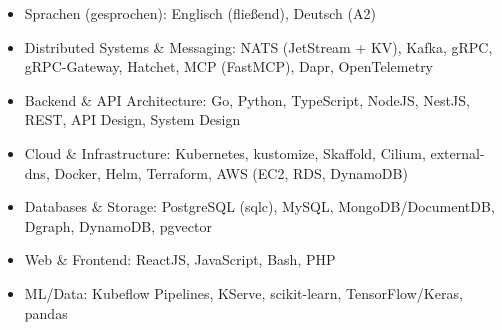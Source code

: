 \documentclass[10pt,a4paper]{resume}
\begin{document}
\begin{itemize}[leftmargin=1.4em,nosep,topsep=2pt]
  \item Sprachen (gesprochen): Englisch (fließend), Deutsch (A2)
  \item Distributed Systems \& Messaging: NATS (JetStream + KV), Kafka, gRPC, gRPC-Gateway, Hatchet, MCP (FastMCP), Dapr, OpenTelemetry
  \item Backend \& API Architecture: Go, Python, TypeScript, NodeJS, NestJS, REST, API Design, System Design
  \item Cloud \& Infrastructure: Kubernetes, kustomize, Skaffold, Cilium, external-dns, Docker, Helm, Terraform, AWS (EC2, RDS, DynamoDB)
  \item Databases \& Storage: PostgreSQL (sqlc), MySQL, MongoDB/DocumentDB, Dgraph, DynamoDB, pgvector
  \item Web \& Frontend: ReactJS, JavaScript, Bash, PHP
  \item ML/Data: Kubeflow Pipelines, KServe, scikit-learn, TensorFlow/Keras, pandas
\end{itemize}
\end{document}

